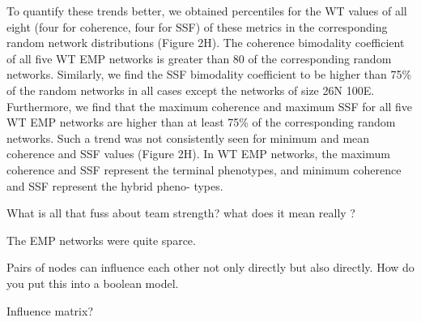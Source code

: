 \documentclass{article}
\begin{document}
\begin{tcolorbox}[colback=yellow!5!white,colframe=yellow!50!black,
  colbacktitle=yellow!75!black,title= ]
  
To quantify these trends better, we obtained percentiles for the WT values of all eight
(four for coherence, four for SSF) of these metrics in the corresponding random network distributions
(Figure 2H). The coherence bimodality coefficient of all five WT EMP networks is greater than 80%
of the corresponding random networks. Similarly, we find the SSF bimodality coefficient to be higher
than 75\% of the random networks in all cases except the networks of size 26N 100E. Furthermore, we
find that the maximum coherence and maximum SSF for all five WT EMP networks are higher than at
least 75\% of the corresponding random networks. Such a trend was not consistently seen for minimum
and mean coherence and SSF values (Figure 2H). In WT EMP networks, the maximum coherence and
SSF represent the terminal phenotypes, and minimum coherence and SSF represent the hybrid pheno-
types.  
\end{tcolorbox}


What is all that fuss about team strength? what does it mean really ? 

The EMP networks were quite sparce. 

Pairs of nodes can influence each other not only directly but also directly. How do you put this into a boolean model. 



Influence matrix? 
\end{document}
